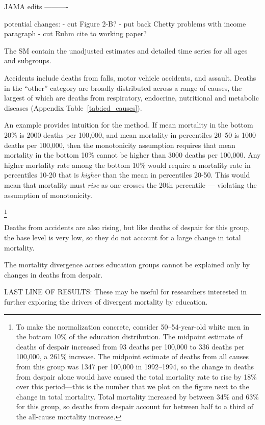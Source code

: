 \begin{center}
JAMA edits
----------

potential changes:
- cut Figure 2-B?
- put back Chetty problems with income paragraph
- cut Ruhm cite to working paper?

The SM contain the unadjusted estimates and
detailed time series for all ages and subgroups.

Accidents include deaths from falls,
motor vehicle accidents, and assault. Deaths in the ``other'' category
are broadly distributed across a range of causes, the largest of which
are deaths from respiratory, endocrine, nutritional and metabolic
diseases (Appendix Table~\ref{tab:icd_causes}).  

An example provides intuition for the method. If mean mortality in the
bottom 20\% is 2000 deaths per 100,000, and mean mortality in
percentiles 20--50 is 1000 deaths per 100,000, then the monotonicity
assumption requires that mean mortality in the bottom 10\% cannot be
higher than 3000 deaths per 100,000. Any higher mortality rate among
the bottom 10\% would require a mortality rate in percentiles 10-20
that is \textit{higher} than the mean in percentiles 20-50. This would
mean that mortality must \textit{rise} as one crosses the 20th
percentile --- violating the assumption of monotonicity.

\footnote{To make the normalization concrete, consider
  50--54-year-old white men in the bottom 10\% of the education
  distribution. The midpoint estimate of deaths of despair increased
  from 93 deaths per 100,000 to 336 deaths per 100,000, a 261\%
  increase. The midpoint estimate of deaths from all causes from this
  group was 1347 per 100,000 in 1992--1994, so the change in deaths
  from despair alone would have caused the total mortality rate to
  rise by 18\% over this period---this is the number that we plot on
  the figure next to the change in total mortality. Total mortality
  increased by between 34\% and 63\% for this group, so deaths from
  despair account for between half to a third of the all-cause
  mortality increase.}

Deaths
from accidents are also rising, but like deaths of despair for this
group, the base level is very low, so they do not account for a large
change in total mortality.


The mortality divergence across education
groups cannot be explained only by changes in deaths from despair.

LAST LINE OF RESULTS:  These may be useful for
researchers interested in further exploring the drivers of divergent
mortality by education.


\end{center}
